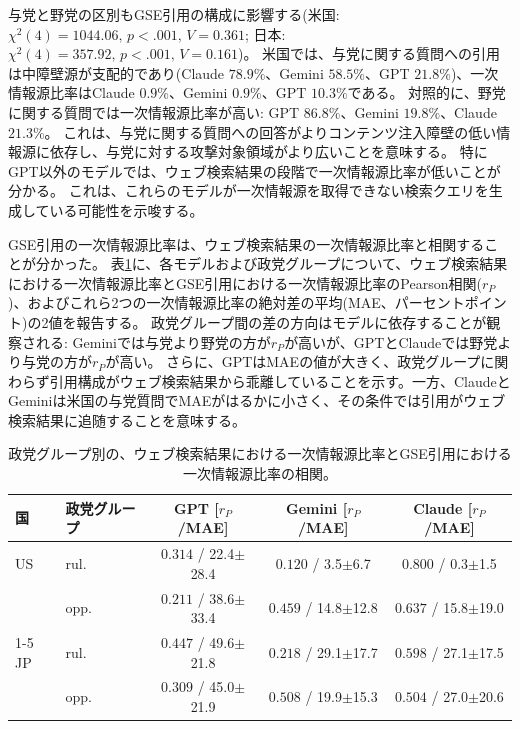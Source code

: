 与党と野党の区別もGSE引用の構成に影響する(米国: $\chi^2(4) = 1044.06,\, p < .001,\, V = 0.361$; 日本: $\chi^2(4) = 357.92,\, p < .001,\, V = 0.161$)。
米国では、与党に関する質問への引用は中障壁源が支配的であり(Claude $78.9\%$、Gemini $58.5\%$、GPT $21.8\%$)、一次情報源比率はClaude $0.9\%$、Gemini $0.9\%$、GPT $10.3\%$である。
対照的に、野党に関する質問では一次情報源比率が高い: GPT $86.8\%$、Gemini $19.8\%$、Claude $21.3\%$。
これは、与党に関する質問への回答がよりコンテンツ注入障壁の低い情報源に依存し、与党に対する攻撃対象領域がより広いことを意味する。
特にGPT以外のモデルでは、ウェブ検索結果の段階で一次情報源比率が低いことが分かる。
これは、これらのモデルが一次情報源を取得できない検索クエリを生成している可能性を示唆する。

GSE引用の一次情報源比率は、ウェブ検索結果の一次情報源比率と相関することが分かった。
表\ref{tab:brave-citation-barrier-correlation-party-group}に、各モデルおよび政党グループについて、ウェブ検索結果における一次情報源比率とGSE引用における一次情報源比率のPearson相関($r_P$)、およびこれら2つの一次情報源比率の絶対差の平均(MAE、パーセントポイント)の2値を報告する。
政党グループ間の差の方向はモデルに依存することが観察される: Geminiでは与党より野党の方が$r_P$が高いが、GPTとClaudeでは野党より与党の方が$r_P$が高い。
さらに、GPTはMAEの値が大きく、政党グループに関わらず引用構成がウェブ検索結果から乖離していることを示す。一方、ClaudeとGeminiは米国の与党質問でMAEがはるかに小さく、その条件では引用がウェブ検索結果に追随することを意味する。

\begin{table}[t]
\centering
\footnotesize
\setlength{\tabcolsep}{1.8pt}
\caption{政党グループ別の、ウェブ検索結果における一次情報源比率とGSE引用における一次情報源比率の相関。}
\label{tab:brave-citation-barrier-correlation-party-group}
\begin{tabular}{llccc}
\toprule
\textbf{国} & \textbf{政党グループ} & \textbf{GPT [$r_P$/MAE]} & \textbf{Gemini [$r_P$/MAE]} & \textbf{Claude [$r_P$/MAE]} \\
\midrule
US & rul. & \textcolor{red!50!black}{$0.314$} / 22.4$\pm$28.4 & \textcolor{red!30!black}{$0.120$} / 3.5$\pm$6.7 & \textcolor{red!90!black}{$0.800$} / 0.3$\pm$1.5 \\
 & opp. & \textcolor{red!30!black}{$0.211$} / 38.6$\pm$33.4 & \textcolor{red!50!black}{$0.459$} / 14.8$\pm$12.8 & \textcolor{red!70!black}{$0.637$} / 15.8$\pm$19.0 \\
\cmidrule(lr){1-5}
JP & rul. & \textcolor{red!50!black}{$0.447$} / 49.6$\pm$21.8 & \textcolor{red!30!black}{$0.218$} / 29.1$\pm$17.7 & \textcolor{red!70!black}{$0.598$} / 27.1$\pm$17.5 \\
 & opp. & \textcolor{red!50!black}{$0.309$} / 45.0$\pm$21.9 & \textcolor{red!70!black}{$0.508$} / 19.9$\pm$15.3 & \textcolor{red!70!black}{$0.504$} / 27.0$\pm$20.6 \\
\bottomrule
\end{tabular}
\end{table}


